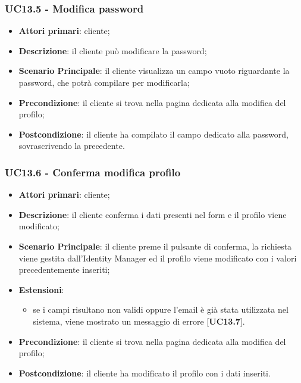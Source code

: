 \subsubsection{UC13.5 - Modifica password}
\begin{itemize}
\item \textbf{Attori primari}: cliente;
\item \textbf{Descrizione}: il cliente può modificare la password;
\item \textbf{Scenario Principale}: il cliente visualizza un campo vuoto riguardante la password, che potrà compilare per modificarla;
\item \textbf{Precondizione}: il cliente si trova nella pagina dedicata alla modifica del profilo;
\item \textbf{Postcondizione}: il cliente ha compilato il campo dedicato alla password, sovrascrivendo la precedente.
\end{itemize}

\subsubsection{UC13.6 - Conferma modifica profilo}
\begin{itemize}
\item \textbf{Attori primari}: cliente;
\item \textbf{Descrizione}: il cliente conferma i dati presenti nel form e il profilo viene modificato;
\item \textbf{Scenario Principale}: il cliente preme il pulsante di conferma, la richiesta viene gestita dall'Identity Manager ed il profilo viene modificato con i valori precedentemente inseriti;
\item \textbf{Estensioni}: 
\begin{itemize}
\item se i campi risultano non validi oppure l'email è già stata utilizzata nel sistema, viene mostrato un messaggio di errore [\textbf{UC13.7}].
\end{itemize}
\item \textbf{Precondizione}: il cliente si trova nella pagina dedicata alla modifica del profilo;
\item \textbf{Postcondizione}: il cliente ha modificato il profilo con i dati inseriti.
\end{itemize}

